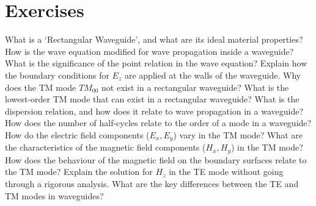 \section*{Exercises}
\begin{ExerciseList}
\Exercise[label={ex381}]
What is a `Rectangular Waveguide', and what are its ideal material properties?
\Exercise[label={ex382}]
How is the wave equation modified for wave propagation inside a waveguide?
\Exercise[label={ex383}]
What is the significance of the point relation in the wave equation?
\Exercise[label={ex384}]
Explain how the boundary conditions for $E_z$ are applied at the walls of the waveguide.
\Exercise[label={ex385}]
Why does the TM mode $TM_{00}$ not exist in a rectangular waveguide?
\Exercise[label={ex386}]
What is the lowest-order TM mode that can exist in a rectangular waveguide?
\Exercise[label={ex387}]
What is the dispersion relation, and how does it relate to wave propagation in a waveguide?
\Exercise[label={ex388}]
How does the number of half-cycles relate to the order of a mode in a waveguide?
\Exercise[label={ex389}]
How do the electric field components ($E_x, E_y$) vary in the TM mode?
\Exercise[label={ex3810}]
What are the characteristics of the magnetic field components ($H_x, H_y$) in the TM mode?
\Exercise[label={ex3811}]
How does the behaviour of the magnetic field on the boundary surfaces relate to the TM mode?
\Exercise[label={ex3812}]
Explain the solution for $H_z$ in the TE mode without going through a rigorous analysis.
\Exercise[label={ex3813}]
What are the key differences between the TE and TM modes in waveguides?
\end{ExerciseList}
